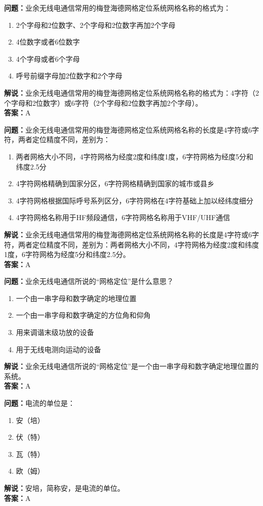 \documentclass{ctexbook}%
\begin{document}
\textbf{问题：}业余无线电通信常用的梅登海德网格定位系统网格名称的格式为：
\begin{enumerate}[label=\Alph*), leftmargin=3em]
\item 2个字母和2位数字、2个字母和2位数字再加2个字母
\item 4位数字或者6位数字
\item 4个字母或者6个字母
\item 呼号前缀字母加2位数字和2个字母
\end{enumerate}
\textbf{解说：}业余无线电通信常用的梅登海德网格定位系统网格名称的格式为：4字符（2个字母和2位数字）或6字符（2个字母和2位数字再加2个字母）。\\
\textbf{答案：}A

\textbf{问题：}业余无线电通信常用的梅登海德网格定位系统网格名称的长度是4字符或6字符，两者定位精度不同，差别为：
\begin{enumerate}[label=\Alph*), leftmargin=3em]
\item 两者网格大小不同，4字符网格为经度2度和纬度1度，6字符网格为经度5分和纬度2.5分
\item 4字符网格精确到国家分区，6字符网格精确到国家的城市或县乡
\item 4字符网格根据国际呼号系列区分，6字符网格在4字符基础上加以经纬度细分
\item 4字符网格名称用于HF频段通信，6字符网格名称用于VHF/UHF通信
\end{enumerate}
\textbf{解说：}业余无线电通信常用的梅登海德网格定位系统网格名称的长度是4字符或6字符，两者定位精度不同，差别为：两者网格大小不同，4字符网格为经度2度和纬度1度，6字符网格为经度5分和纬度2.5分。\\
\textbf{答案：}A

\textbf{问题：}业余无线电通信所说的“网格定位”是什么意思？
\begin{enumerate}[label=\Alph*), leftmargin=3em]
\item 一个由一串字母和数字确定的地理位置
\item 一个由一串字母和数字确定的方位角和仰角
\item 用来调谐末级功放的设备
\item 用于无线电测向运动的设备
\end{enumerate}
\textbf{解说：}业余无线电通信所说的“网格定位”是一个由一串字母和数字确定地理位置的系统。\\
\textbf{答案：}A

\textbf{问题：}电流的单位是：
\begin{enumerate}[label=\Alph*), leftmargin=3em]
\item 安（培）
\item 伏（特）
\item 瓦（特）
\item 欧（姆）
\end{enumerate}
\textbf{解说：}安培，简称安，是电流的单位。\\
\textbf{答案：}A
\end{document}
